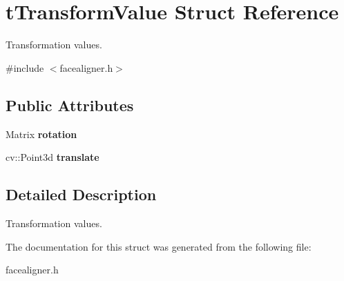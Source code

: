 \hypertarget{structt_transform_value}{\section{t\+Transform\+Value Struct Reference}
\label{structt_transform_value}
}


Transformation values.  




{\ttfamily \#include $<$facealigner.\+h$>$}

\subsection*{Public Attributes}
\begin{DoxyCompactItemize}
\item 
\hypertarget{structt_transform_value_ab9945815ed3789c81e65c48d72013e00}{Matrix {\bfseries rotation}}\label{structt_transform_value_ab9945815ed3789c81e65c48d72013e00}

\item 
\hypertarget{structt_transform_value_a70e9938b6aef9519dbaa00db4aa9dc9d}{cv\+::\+Point3d {\bfseries translate}}\label{structt_transform_value_a70e9938b6aef9519dbaa00db4aa9dc9d}

\end{DoxyCompactItemize}


\subsection{Detailed Description}
Transformation values. 

The documentation for this struct was generated from the following file\+:\begin{DoxyCompactItemize}
\item 
facealigner.\+h\end{DoxyCompactItemize}
